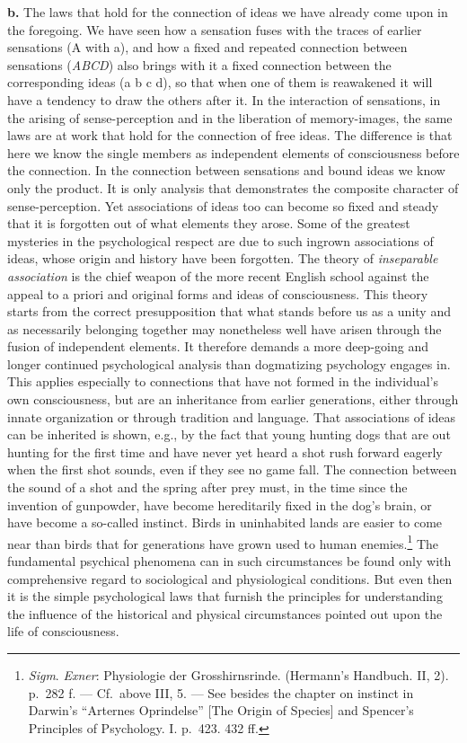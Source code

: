 \documentclass[12pt,a4paper]{book}
\newcommand{\opage}[1]{\marginnote{\footnotesize\textit{[#1]}}}
\begin{document}
\opage{186}\textbf{b.} The laws that hold for the connection of ideas we
have already come upon in the foregoing. We have seen how a sensation fuses
with the traces of earlier sensations (A with a), and how a fixed and
repeated connection between sensations (\emph{ABCD}) also brings with it a
fixed connection between the corresponding ideas (a b c d), so that when
one of them is reawakened it will have a tendency to draw the others after
it. In the interaction of sensations, in the arising of sense-perception
and in the liberation of memory-images, the same laws are at work that
hold for the connection of free ideas. The difference is that here we know
the single members as independent elements of consciousness before the
connection. In the connection between sensations and bound ideas we know
only the product. It is only analysis that demonstrates the composite
character of sense-perception. Yet associations of ideas too can become
so fixed and steady that it is forgotten out of what elements they arose.
Some of the greatest mysteries in the psychological respect are due to
such ingrown associations of ideas, whose origin and history have been
forgotten. The theory of \emph{inseparable association} is the chief
weapon of the more recent English school against the appeal to a priori
and original forms and ideas of consciousness. This theory starts from
the correct presupposition that what stands before us as a unity and as
necessarily belonging together may nonetheless well have arisen through the
fusion of independent elements. It therefore demands a more deep-going and
longer continued psychological analysis than dogmatizing psychology
engages in. This applies especially to connections that have not formed in
the individual's own consciousness, but are an inheritance from earlier
generations, either through innate organization or through tradition and
language. That associations of ideas can be inherited is shown, e.g., by
the fact that young hunting dogs that are out hunting for the first time
and have never yet heard a shot rush forward eagerly when the first shot
sounds, even if they see no game fall. The connection between the sound of
a shot and the spring after prey must, in the time since the invention of
gunpowder, have become hereditarily fixed in the dog's brain, or have
become a so-called instinct. Birds in uninhabited lands are
\opage{187}easier to come near than birds that for generations have grown
used to human enemies.\footnote{\emph{Sigm}. \emph{Exner}: Physiologie der
Grosshirnsrinde. (Hermann's Handbuch. II, 2). p.~282 f. --- Cf.\ above
III, 5. --- See besides the chapter on instinct in Darwin's ``Arternes
Oprindelse'' [The Origin of Species] and Spencer's Principles of
Psychology. I. p.~423. 432 ff.} The fundamental psychical phenomena can in
such circumstances be found only with comprehensive regard to sociological
and physiological conditions. But even then it is the simple psychological
laws that furnish the principles for understanding the influence of the
historical and physical circumstances pointed out upon the life of
consciousness.
\end{document}
